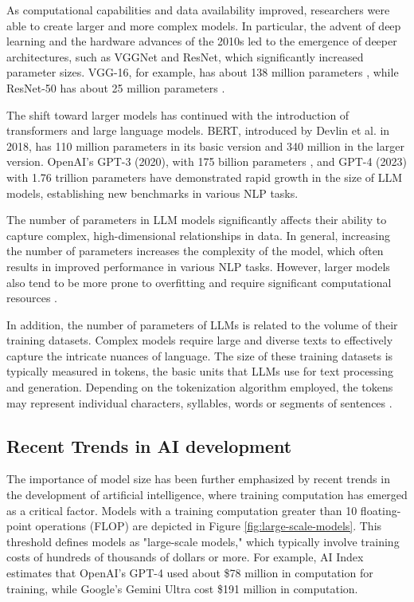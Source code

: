 As computational capabilities and data availability improved, researchers were able to create larger and more complex models. In particular, the advent of deep learning and the hardware advances of the 2010s led to the emergence of deeper architectures, such as VGGNet and ResNet, which significantly increased parameter sizes. VGG-16, for example, has about 138 million parameters \cite{simonyan2014very}, while ResNet-50 has about 25 million parameters \cite{he2016deep}.

The shift toward larger models has continued with the introduction of transformers and large language models. BERT, introduced by Devlin et al. \cite{devlin2018bert} in 2018, has 110 million parameters in its basic version and 340 million in the larger version. OpenAI's GPT-3 (2020), with 175 billion parameters \cite{brown2020language}, and GPT-4 (2023) with 1.76 trillion parameters \cite{achiam2023gpt} have demonstrated rapid growth in the size of LLM models, establishing new benchmarks in various NLP tasks.

The number of parameters in LLM models significantly affects their ability to capture complex, high-dimensional relationships in data. In general, increasing the number of parameters increases the complexity of the model, which often results in improved performance in various NLP tasks. However, larger models also tend to be more prone to overfitting and require significant computational resources \cite{zhao2023survey, villalobos2022machine, wei2022emergent}.

In addition, the number of parameters of LLMs is related to the volume of their training datasets. Complex models require large and diverse texts to effectively capture the intricate nuances of language. The size of these training datasets is typically measured in tokens, the basic units that LLMs use for text processing and generation. Depending on the tokenization algorithm employed, the tokens may represent individual characters, syllables, words or segments of sentences \cite{brown2020language}.

\subsection{Recent Trends in AI development}

The importance of model size has been further emphasized by recent trends in the development of artificial intelligence, where training computation has emerged as a critical factor. Models with a training computation greater than 10 floating-point operations (FLOP) are depicted in Figure \ref{fig:large-scale-models}. This threshold defines models as "large-scale models," which typically involve training costs of hundreds of thousands of dollars or more. For example, AI Index estimates that OpenAI's GPT-4 used about \$78 million in computation for training, while Google's Gemini Ultra cost \$191 million in computation. \cite{epoch2024trackinglargescaleaimodels,maslej2024ai} 

